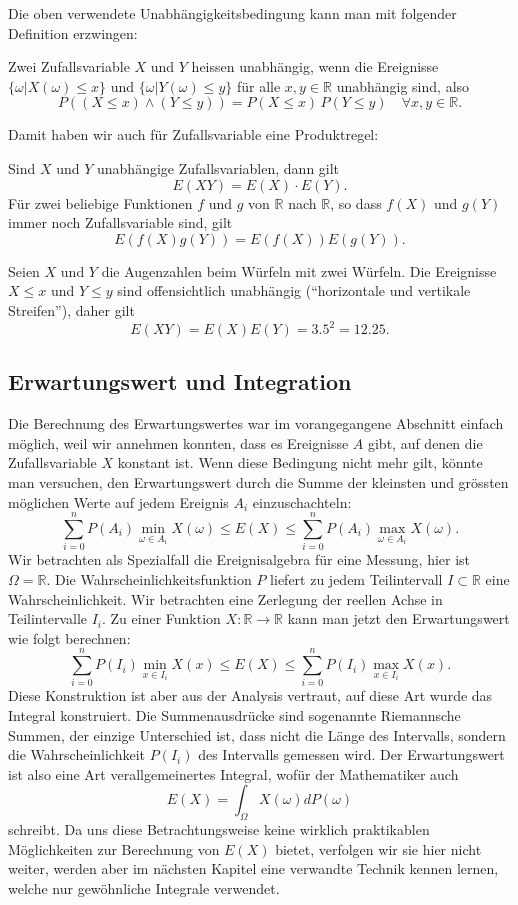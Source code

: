 Die oben verwendete Unabhängigkeitsbedingung kann man mit folgender
Definition erzwingen:
\begin{definition}Zwei Zufallsvariable $X$ und $Y$ heissen
unabhängig, wenn die Ereignisse $\{\omega|X(\omega)\le x\}$
und $\{\omega|Y(\omega)\le y\}$ für alle $x,y\in\mathbb R$
unabhängig sind, also
\[
P((X\le x)\wedge(Y\le y))=P(X\le x)\,P(Y\le y)\quad\forall x,y\in\mathbb{R}.
\]
\end{definition}
Damit haben wir auch für Zufallsvariable eine Produktregel:
\begin{satz}
\label{produktregel-erwartungswert}
Sind $X$ und $Y$ unabhängige Zufallsvariablen, dann gilt
\[
E(XY)=E(X)\cdot E(Y).
\]
Für zwei beliebige Funktionen $f$ und $g$ von $\mathbb{R}$ nach $\mathbb{R}$,
so dass $f(X)$ und $g(Y)$ immer noch Zufallsvariable sind, gilt
\[
E(f(X)g(Y))=E(f(X))E(g(Y)).
\]
\end{satz}
Seien $X$ und $Y$ die Augenzahlen beim Würfeln mit zwei Würfeln.
Die Ereignisse $X\le x$ und $Y\le y$ sind offensichtlich unabhängig
(``horizontale und vertikale Streifen''), daher gilt
\[
E(XY)=E(X)E(Y)=3.5^2=12.25.
\]

\subsection{Erwartungswert und Integration}
Die Berechnung des Erwartungswertes war im vorangegangene Abschnitt
einfach möglich, weil wir annehmen konnten, dass es Ereignisse $A$
gibt, auf denen die Zufallsvariable $X$ konstant ist.
Wenn diese
Bedingung nicht mehr gilt, könnte man versuchen, den Erwartungswert
durch die Summe der kleinsten und grössten möglichen Werte auf jedem
Ereignis $A_i$ einzuschachteln:
\[
\sum_{i=0}^nP(A_i)\min_{\omega\in A_i}X(\omega)
\le E(X)\le
\sum_{i=0}^nP(A_i)\max_{\omega\in A_i}X(\omega).
\]
Wir betrachten als Spezialfall die Ereignisalgebra für eine
Messung, hier ist $\Omega=\mathbb{R}$.
Die Wahrscheinlichkeitsfunktion $P$
liefert zu jedem Teilintervall $I\subset \mathbb{R}$ eine Wahrscheinlichkeit.
Wir betrachten eine Zerlegung der reellen Achse in Teilintervalle $I_i$.
Zu einer Funktion $X\colon \mathbb{R}\to\mathbb{R}$ kann man jetzt den
Erwartungswert wie folgt berechnen:
\[
\sum_{i=0}^nP(I_i)\min_{x\in I_i}X(x)
\le E(X)\le
\sum_{i=0}^nP(I_i)\max_{x\in I_i}X(x).
\]
Diese Konstruktion ist aber aus der Analysis vertraut, auf diese
Art wurde das Integral konstruiert.
Die Summenausdrücke sind sogenannte
Riemannsche Summen, der einzige Unterschied ist, dass nicht die Länge des
Intervalls, sondern die Wahrscheinlichkeit $P(I_i)$ des Intervalls gemessen
wird.
Der Erwartungswert ist also eine Art verallgemeinertes Integral,
wofür der Mathematiker auch 
\[
E(X)=\int_{\Omega}X(\omega)dP(\omega)
\]
schreibt.
Da uns diese Betrachtungsweise keine wirklich praktikablen
Möglichkeiten zur Berechnung von $E(X)$ bietet, verfolgen wir sie
hier nicht weiter, werden aber im nächsten Kapitel eine verwandte
Technik kennen lernen, welche nur gewöhnliche Integrale verwendet.

